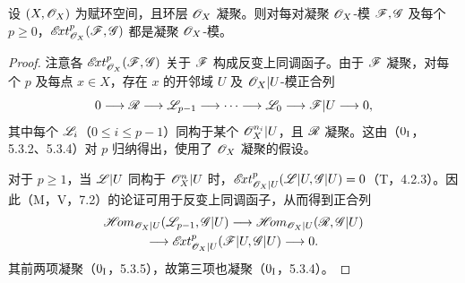 设 $(X,\mathscr O_X)$ 为赋环空间，且环层 $\mathscr O_X$ 凝聚。则对每对凝聚 $\mathscr O_X$-模 $\mathscr F,\mathscr G$ 及每个 $p\geq0$，$\mathscr{E}\!xt^p_{\mathscr O_X}(\mathscr F,\mathscr G)$ 都是凝聚 $\mathscr O_X$-模。
\begin{proof}
注意各 $\mathscr{E}\!xt^p_{\mathscr O_X}(\mathscr F,\mathscr G)$ 关于 $\mathscr F$ 构成反变上同调函子。由于 $\mathscr F$ 凝聚，对每个 $p$ 及每点 $x\in X$，存在 $x$ 的开邻域 $U$ 及 $\mathscr O_X|U$-模正合列
\[
0\longrightarrow\mathscr R\longrightarrow\mathscr L_{p-1}\longrightarrow\cdots
\longrightarrow\mathscr L_0\longrightarrow\mathscr F|U\longrightarrow0,
\]
其中每个 $\mathscr L_i$（$0\leq i\leq p-1$）同构于某个 $\mathscr O_X^{n_i}|U$，且 $\mathscr R$ 凝聚。这由（$0_{\mathrm I}$，5.3.2、5.3.4）对 $p$ 归纳得出，使用了 $\mathscr O_X$ 凝聚的假设。

对于 $p\geq1$，当 $\mathscr L|U$ 同构于 $\mathscr O_X^n|U$ 时，$\mathscr{E}\!xt^p_{\mathscr O_X|U}(\mathscr L|U,\mathscr G|U)=0$（T，4.2.3）。因此（M，V，7.2）的论证可用于反变上同调函子，从而得到正合列
\[
\begin{gathered}
\mathscr{H}\!om_{\mathscr O_X|U}(\mathscr L_{p-1},\mathscr G|U)
\longrightarrow\mathscr{H}\!om_{\mathscr O_X|U}(\mathscr R,\mathscr G|U)\\
\longrightarrow\mathscr{E}\!xt^p_{\mathscr O_X|U}(\mathscr F|U,\mathscr G|U)\longrightarrow0.
\end{gathered}
\]
其前两项凝聚（$0_{\mathrm I}$，5.3.5），故第三项也凝聚（$0_{\mathrm I}$，5.3.4）。
\end{proof}


